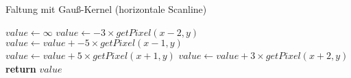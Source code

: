 \begin{algorithm}
	\caption{Faltung mit Gauß-Kernel (horizontale Scanline)}
	\label{src:analyseConvolution}
	\begin{algorithmic}[1]
		\State $value \gets \infty$
		\State $value \gets -3 \times getPixel(x - 2, y)$
		\State $value \gets value + -5 \times getPixel(x - 1, y)$
		\State $value \gets value + 5 \times getPixel(x + 1, y)$
		\State $value \gets value + 3 \times getPixel(x + 2, y)$
		\State \textbf{return} $value$
		\EndProcedure
	\end{algorithmic}
\end{algorithm}
